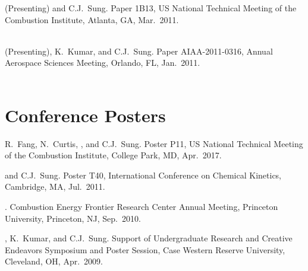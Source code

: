 \begin{bibmune}
\item {} (Presenting) and C.J.\ Sung.
         Paper 1B13,   US National Technical
        Meeting of the Combustion Institute, Atlanta, GA, Mar.\ 2011.\\
        \\

\item {} (Presenting), K.\ Kumar, and C.J.\ Sung.
         Paper AIAA-2011-0316,
         Annual Aerospace Sciences Meeting,
        Orlando, FL, Jan.\ 2011.\\
        \\
\end{bibmune}

\section{{\sectionfont Conference Posters}}

\begin{bibmune}
\item R.\ Fang, N.\ Curtis, , and C.J.\ Sung.
       Poster
      P11,  US National Technical Meeting of the Combustion
      Institute, College Park, MD, Apr.\ 2017.

\item {} and C.J.\ Sung.  Poster T40,  International
        Conference on Chemical Kinetics, Cambridge, MA, Jul.\ 2011.\\

\item {}. 
         Combustion Energy Frontier Research Center
        Annual Meeting, Princeton University, Princeton, NJ,
        Sep.\ 2010.\\

\item {}, K.\ Kumar, and C.J.\ Sung.  Support of Undergraduate
        Research and Creative Endeavors Symposium and Poster Session,
        Case Western Reserve University, Cleveland, OH, Apr.\ 2009.\\
\end{bibmune}

